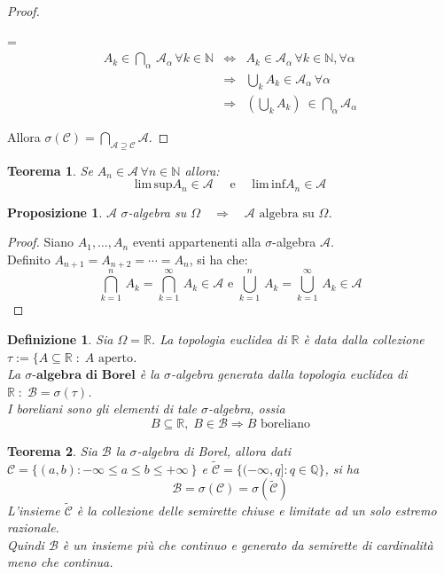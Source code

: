 \documentclass[a4paper,12pt]{article}
\theoremstyle{break}
\newtheorem{theorem}{Teorema}[section]
\newtheorem{proposition}{Proposizione}[section]
\newtheorem{definition}{Definizione}[section]
\numberwithin{equation}{section}
\begin{document}
\begin{proof}
\begin{enumerate}
\begin{itemize}
{\everymath ={\displaystyle}
$$
\begin{array}{lcl}
A_k \in \bigcap_{\alpha} \, \mathcal{A}_{\alpha} \, \forall k \in \mathbb{N} & \Longleftrightarrow & A_k \in \mathcal{A}_{\alpha} \, \forall k \in \mathbb{N}, \forall \alpha \\
& \Longrightarrow & \bigcup_k A_k \in \mathcal{A}_{\alpha} \, \forall \alpha \\
& \Longrightarrow & \left( \bigcup_k A_k \right)\ \in \bigcap_{\alpha} \mathcal{A}_{\alpha} 
\end{array}
$$
}
\end{itemize}
\end{enumerate}
Allora $\sigma(\mathcal{C}) = {\displaystyle \bigcap_{\mathcal{A} \supseteq \mathcal{C}}} \mathcal{A}$.
\end{proof}
\begin{theorem}
Se $A_n \in \mathcal{A} \, \forall n \in \mathbb{N}$ allora:
$$
\mbox{lim}\,\mbox{sup}A_n \in \mathcal{A} \quad \mbox{ e } \quad \mbox{lim}\,\mbox{inf} A_n \in \mathcal{A}
$$
\end{theorem}
\begin{proposition}
$\mathcal{A} \,\,\sigma$-algebra su $\Omega \quad \Longrightarrow \quad \mathcal{A} \mbox{ algebra su } \Omega$.
\end{proposition}
\begin{proof}
Siano $A_1,\ldots, A_n$ eventi appartenenti alla $\sigma$-algebra $\mathcal{A}$. \\
Definito $A_{n+1} = A_{n+2} = \cdots = A_n$, si ha che:
$$
\bigcap_{k=1}^n \, A_k = \bigcap_{k=1}^{\infty} \, A_k \in \mathcal{A} \mbox{ e } \bigcup_{k=1}^n \, A_k = \bigcup_{k=1}^{\infty} \, A_k \in \mathcal{A}
$$
\end{proof}
\begin{definition}
  Sia \(\Omega = \mathbb{R}\). La topologia euclidea di \(\mathbb{R}\) è data dalla collezione \(\tau := \lbrace A \subseteq \mathbb{R} \; : \; A \text{ aperto}\). \\
  La \(\sigma\textbf{-algebra di Borel}\) è la \(\sigma\)-algebra generata dalla topologia euclidea di \(\mathbb{R} \; : \; \mathcal{B} = \sigma(\tau)\). \\
  I boreliani sono gli elementi di tale \(\sigma\)-algebra, ossia \[B \subseteq \mathbb{R}, \; B \in \mathcal{B} \Longrightarrow B \text{ boreliano}\]
\end{definition}
\begin{theorem}
  Sia \(\mathcal{B}\) la \(\sigma\)-algebra di Borel, allora dati \(\mathcal{C} = \lbrace (a,b) : -\infty \leq a \leq b \leq +\infty\ \rbrace \) e \(\tilde{\mathcal{C}} = \lbrace (-\infty, q] : q \in \mathbb{Q} \rbrace\), si ha
  \[
    \mathcal{B} = \sigma(\mathcal{C}) = \sigma(\tilde{\mathcal{C}})
  \]
  L'insieme \(\tilde{\mathcal{C}}\) è la collezione delle semirette chiuse e limitate ad un solo estremo razionale. \\Quindi \(\mathcal{B}\) è un insieme più che continuo e generato da semirette di cardinalità meno che continua.
\end{theorem}
\end{document}

